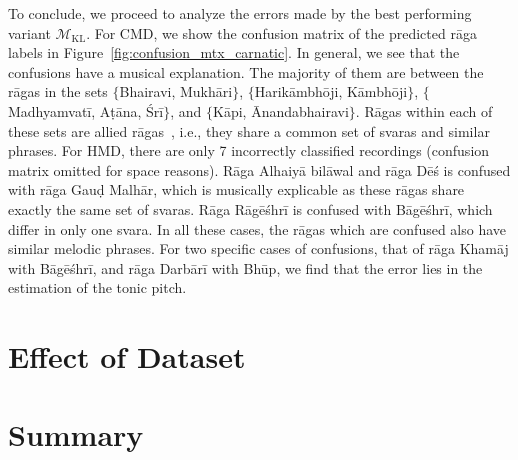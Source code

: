 

To conclude, we proceed to analyze the errors made by the best performing variant $\mathcal{M}_{\mathrm{KL}}$. For  CMD, we show the confusion matrix of the predicted r\={a}ga labels in Figure~\ref{fig:confusion_mtx_carnatic}. In general, we see that the confusions have a musical explanation. The majority of them are between the r\={a}gas in the sets $\lbrace$Bhairavi, Mukh\={a}ri$\rbrace$, $\lbrace$Harik\={a}mbh\={o}ji, K\={a}mbh\={o}ji$\rbrace$, $\lbrace$Madhyamvat\={i}, A\d{t}\={a}na, \'Sr\={i}$\rbrace$, and $\lbrace$K\={a}pi, \={A}nandabhairavi$\rbrace$. R\={a}gas within each of these sets are allied r\={a}gas~\cite{Viswanathan2004}, i.e., they share a common set of svaras and similar phrases. For HMD, there are only 7 incorrectly classified recordings (confusion matrix omitted for space reasons). R\={a}ga Alhaiy\={a} bil\={a}wal and r\={a}ga D\={e}\'{s} is confused with r\={a}ga Gau\d{d} Malh\={a}r, which is musically explicable as these r\={a}gas share exactly the same set of svaras. R\={a}ga R\={a}g\={e}\'{s}hr\={i} is confused with B\={a}g\={e}\'{s}hr\={i}, which differ in only one svara. In all these cases, the r\={a}gas which are confused also have similar melodic phrases. For two specific cases of confusions, that of r\={a}ga  Kham\={a}j with B\={a}g\={e}\'{s}hr\={i}, and r\={a}ga Darb\={a}r\={i} with Bh\={u}p, we find that the error lies in the estimation of the tonic pitch.


\section{Effect of Dataset}
\label{}

\section{Summary}
\label{sec:summary_raga_recognition}




